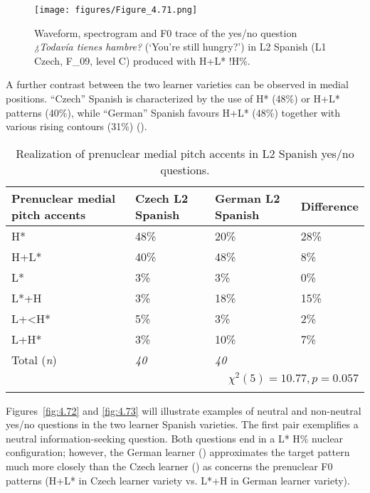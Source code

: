 \begin{figure}


\texttt{[image: figures/Figure\_4.71.png]}



\caption{Waveform, spectrogram and F0 trace of the yes/no question \textit{¿Todavía tienes hambre?} (‘You’re still hungry?’) in L2 Spanish (L1 Czech, F\_09, level C) produced with H+L* !H\%.}
\label{fig:4.71}
\end{figure}

A further contrast between the two learner varieties can be observed in medial positions. “Czech” Spanish is characterized by the use of H* (48\%) or H+L* patterns (40\%), while “German” Spanish favours H+L* (48\%) together with various rising contours (31\%) ().

\begin{table}
\begin{tabularx}{\textwidth}{lYYY}

\lsptoprule

{Prenuclear medial pitch accents} & {Czech L2 Spanish} & {German L2 Spanish} & {Difference}\\
\midrule
H* &  48\% &  20\% &  28\%\\
H+L* &  40\% &  48\% &  8\%\\
L* &  3\% &  3\% &  0\%\\
L*+H &  3\% &  18\% &  15\%\\
L+<H* &  5\% &  3\% &  2\%\\
L+H* &  3\% &  10\% &  7\%\\
\midrule
Total (\textit{n}) & {\itshape 40} & {\itshape 40} &  \\
\\
\lspbottomrule
\end{tabularx}

\caption{Realization of prenuclear medial pitch accents in L2 Spanish yes/no questions.}
\label{tab:4.21}
\end{table}


Figures~\ref{fig:4.72} and \ref{fig:4.73} will illustrate examples of neutral and non-neutral yes\slash no questions in the two learner Spanish varieties. The first pair exemplifies a neutral information-seeking question. Both questions end in a L* H\% nuclear configuration; however, the German learner () approximates the target pattern much more closely than the Czech learner () as concerns the prenuclear F0 patterns (H+L* in Czech learner variety vs. L*+H in German learner variety).


